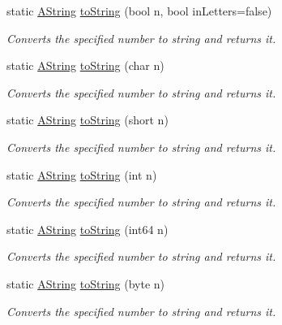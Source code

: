 \begin{DoxyCompactItemize}
\item 
static \mbox{\hyperlink{class_a_string}{A\+String}} \mbox{\hyperlink{class_a_string_a13ac330330d3f576a06e8ef3316ef293}{to\+String}} (bool n, bool in\+Letters=false)
\begin{DoxyCompactList}\small\item\em Converts the specified number to string and returns it. \end{DoxyCompactList}\item 
static \mbox{\hyperlink{class_a_string}{A\+String}} \mbox{\hyperlink{class_a_string_a364c9570a8fc099dd09ce78ae8818dc7}{to\+String}} (char n)
\begin{DoxyCompactList}\small\item\em Converts the specified number to string and returns it. \end{DoxyCompactList}\item 
static \mbox{\hyperlink{class_a_string}{A\+String}} \mbox{\hyperlink{class_a_string_a82429501ef9ff6b7c629ad60413d1c3e}{to\+String}} (short n)
\begin{DoxyCompactList}\small\item\em Converts the specified number to string and returns it. \end{DoxyCompactList}\item 
static \mbox{\hyperlink{class_a_string}{A\+String}} \mbox{\hyperlink{class_a_string_a90c07f40ff8685c41a3c6db271754686}{to\+String}} (int n)
\begin{DoxyCompactList}\small\item\em Converts the specified number to string and returns it. \end{DoxyCompactList}\item 
static \mbox{\hyperlink{class_a_string}{A\+String}} \mbox{\hyperlink{class_a_string_a47d640a0d7b63e9253f57568d2ff2542}{to\+String}} (int64 n)
\begin{DoxyCompactList}\small\item\em Converts the specified number to string and returns it. \end{DoxyCompactList}\item 
static \mbox{\hyperlink{class_a_string}{A\+String}} \mbox{\hyperlink{class_a_string_ae64483053e51e9e0041763ec5eb21ba5}{to\+String}} (byte n)
\begin{DoxyCompactList}\small\item\em Converts the specified number to string and returns it. \end{DoxyCompactList}\item 

\end{DoxyCompactItemize}
